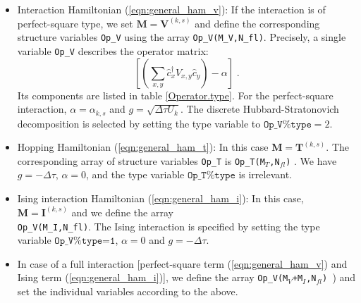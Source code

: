 \begin{itemize}
\item Interaction Hamiltonian (\ref{eqn:general_ham_v}):
If the interaction is of perfect-square type, we set  ${\bm M}  = \bm{V}^{(k,s)}$ 
and  define the corresponding structure variables \texttt{Op\_V}  using the array \texttt{Op\_V(M\_V,N\_{fl})}.
Precisely, a single variable  \texttt{Op\_V}  describes the operator matrix:
\begin{equation}
             \left[ \left( \sum_{x,y} \hat{c}^{\dagger}_x V_{x,y} \hat{c}^{\phantom{\dagger}}_{y}  \right) - \alpha \right]  \;.
\end{equation} 
Its components are listed in table \ref{Operator.type}. For the perfect-square interaction, $\alpha = \alpha_{k,s}$ and $g = \sqrt{\Delta \tau  U_k}$. 
The discrete Hubbard-Stratonovich decomposition is selected by setting the type variable to $\texttt{Op\_V\%type}=2$.
\item Hopping Hamiltonian (\ref{eqn:general_ham_t}): 
In this case $\bm{M}=\bm{T}^{(k,s)}$. The corresponding array of structure variables \texttt{Op\_T} is  \texttt{Op\_T(M$_T$,N$_{fl}$)} . 
We have $g=-\Delta \tau$, $\alpha = 0$, and the type variable $\texttt{Op\_T\%type}$  is irrelevant. 

\item Ising interaction Hamiltonian (\ref{eqn:general_ham_i}):
In this case, $\bm{M}  = \bm{I}^{(k,s)} $ and we define the array\\ \texttt{Op\_V(M\_I,N\_{fl})}. 
The Ising interaction is specified by setting the type variable  $\texttt{Op\_V\%type=1}$, $\alpha = 0$ and $g = -\Delta \tau$.  

\item In case of a full interaction [perfect-square term (\ref{eqn:general_ham_v}) and Ising term (\ref{eqn:general_ham_i})], we  define  the array \texttt{Op\_V(M$_V$+M$_I$,N$_{fl}$) }) and set 
the individual variables according to the above.  

\end{itemize}

